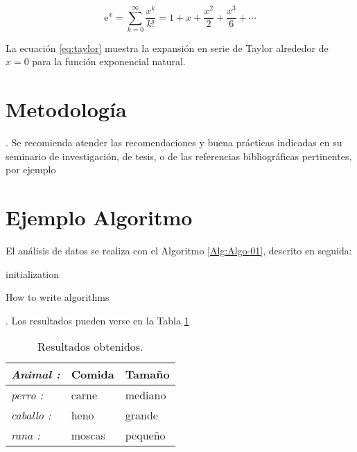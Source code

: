 \documentclass[12pt]{article}
\begin{document}
\begin{equation}                                                     
\mathrm{e}^{x} = \sum_{k=0}^{\infty} \frac{x^k}{k!} = 
1 + x + \frac{x^2}{2} + \frac{x^3}{6} + \cdots
\label{eq:taylor}
\end{equation}

La ecuación \eqref{eq:taylor} muestra la expansión en serie de Taylor alrededor de $x = 0$ para la función exponencial natural.


\section{Metodología}
\lipsum[1-2]. 
Se recomienda atender las recomendaciones y buena prácticas indicadas en su seminario de investigación, de tesis, o de
las referencias bibliográficas pertinentes, por ejemplo \cite{Sampieri}

\section{Ejemplo Algoritmo}
\lipsum[1]

El análisis de datos se realiza con el Algoritmo \ref{Alg:Algo-01}, descrito en seguida:

\begin{algorithm}[H]
  \SetAlgoLined
  initialization\;
  \caption{How to write algorithms}
  \label{Alg:Algo-01}
\end{algorithm}


\lipsum[1].  
Los resultados pueden verse en la Tabla \ref{tab:Tabla1}

\begin{table}[htbp]
\centering
\caption{Resultados obtenidos.}
\label{tab:pversust}
\begin{tabular}{>{\itshape}l<{:} *{2}{l}}
  \toprule
  Animal  & Comida & Tamaño  \\
  \midrule
  perro   & carne  & mediano \\
  caballo & heno   & grande  \\
  rana    & moscas & pequeño \\
  \bottomrule
\end{tabular}
\label{tab:Tabla1}
\end{table}
\end{document}
